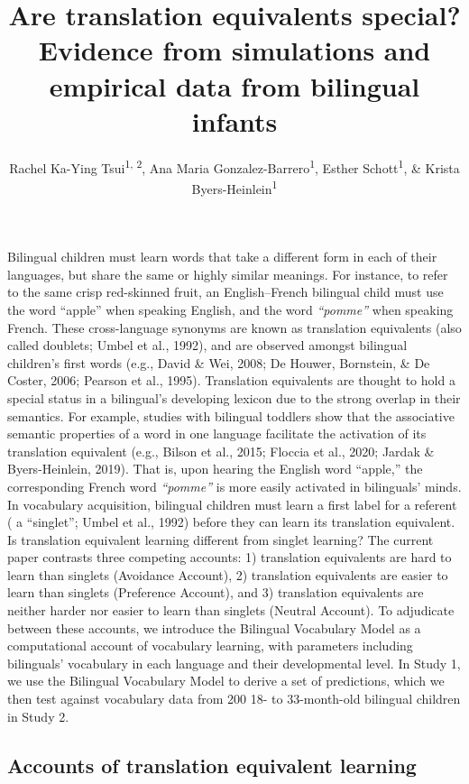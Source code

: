 \documentclass[
  english,
  ,man,floatsintext]{apa6}
\title{Are translation equivalents special? Evidence from simulations and empirical data from bilingual infants}
\author{Rachel Ka-Ying Tsui\textsuperscript{1, 2}, Ana Maria Gonzalez-Barrero\textsuperscript{1}, Esther Schott\textsuperscript{1}, \& Krista Byers-Heinlein\textsuperscript{1}}
\date{}
\affiliation{\vspace{0.5cm}\textsuperscript{1} Department of Psychology, Concordia University\\\textsuperscript{2} Laboratory for Language Development, RIKEN Center for Brain Science}
\begin{document}
\maketitle

Bilingual children must learn words that take a different form in each of their languages, but share the same or highly similar meanings. For instance, to refer to the same crisp red-skinned fruit, an English--French bilingual child must use the word ``apple'' when speaking English, and the word \emph{``pomme''} when speaking French. These cross-language synonyms are known as translation equivalents (also called doublets; Umbel et al., 1992), and are observed amongst bilingual children's first words (e.g., David \& Wei, 2008; De Houwer, Bornstein, \& De Coster, 2006; Pearson et al., 1995). Translation equivalents are thought to hold a special status in a bilingual's developing lexicon due to the strong overlap in their semantics. For example, studies with bilingual toddlers show that the associative semantic properties of a word in one language facilitate the activation of its translation equivalent (e.g., Bilson et al., 2015; Floccia et al., 2020; Jardak \& Byers-Heinlein, 2019). That is, upon hearing the English word ``apple,'' the corresponding French word \emph{``pomme''} is more easily activated in bilinguals' minds. In vocabulary acquisition, bilingual children must learn a first label for a referent ( a ``singlet''; Umbel et al., 1992) before they can learn its translation equivalent. Is translation equivalent learning different from singlet learning? The current paper contrasts three competing accounts: 1) translation equivalents are hard to learn than singlets (Avoidance Account), 2) translation equivalents are easier to learn than singlets (Preference Account), and 3) translation equivalents are neither harder nor easier to learn than singlets (Neutral Account). To adjudicate between these accounts, we introduce the Bilingual Vocabulary Model as a computational account of vocabulary learning, with parameters including bilinguals' vocabulary in each language and their developmental level. In Study 1, we use the Bilingual Vocabulary Model to derive a set of predictions, which we then test against vocabulary data from 200 18- to 33-month-old bilingual children in Study 2.

\hypertarget{accounts-of-translation-equivalent-learning}{%
\subsection{Accounts of translation equivalent learning}\label{accounts-of-translation-equivalent-learning}}
\end{document}
